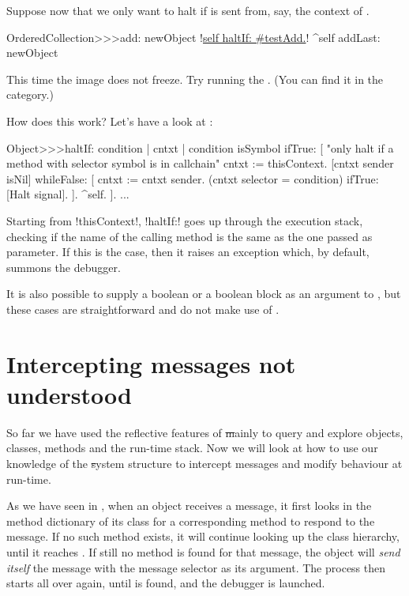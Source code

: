 \documentclass[a4paper,10pt,twoside]{book}
\begin{document}
Suppose now that we only want to halt if  is sent from, say, the context of .

\begin{code}{}
OrderedCollection>>>add: newObject
	!\underline{self haltIf: \#testAdd.}!
	^self addLast: newObject
\end{code}

This time the image does not freeze. Try running the .
(You can find it in the  category.)

How does this work?  Let's have a look at :
\begin{code}{}
Object>>>haltIf: condition
	| cntxt |
	condition isSymbol ifTrue: [
		"only halt if a method with selector symbol is in callchain"
		cntxt := thisContext.
		[cntxt sender isNil] whileFalse: [
			cntxt := cntxt sender. 
			(cntxt selector = condition) ifTrue: [Halt signal]. ].
		^self.
	].
	...
\end{code}

Starting from \ct!thisContext!, \ct!haltIf:! goes up through the execution stack, checking if the name of the calling method is the same as the one passed as parameter.
If this is the case, then it raises an exception which, by default, summons the debugger.

It is also possible to supply a boolean or a boolean block as an argument to , but these cases are straightforward and do not make use of .

\section{Intercepting messages not understood}
\label{sec:msgnotunderstood}

So far we have used the reflective features of \st mainly to query and explore objects, classes, methods and the run-time stack. Now we will look at how to use our knowledge of the \st system structure to intercept messages and modify behaviour at run-time.

As we have seen in , when an object receives a message, it first looks in the method dictionary of its class for a corresponding method to respond to the message.
If no such method exists, it will continue looking up the class hierarchy, until it reaches . If still no method is found for that message, the object will \emph{send itself} the message  with the message selector as its argument.
The process then starts all over again, until  is found, and the debugger is launched.
\end{document}
